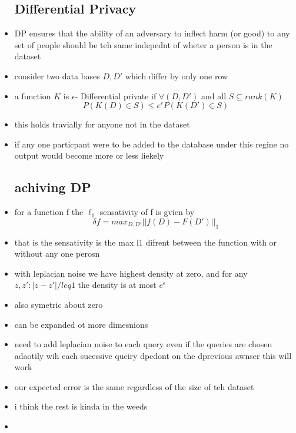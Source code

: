 \documentclass{article}
\begin{document}
\begin{itemize}
\subsection*{Differential Privacy}
\item DP ensures that the ability of an adversary to inflect harm (or good) to any set of people should be teh same indepednt of wheter a person is in the dataset 
\item consider two data bases $D, D'$ which differ by only one row  
\item a function $K$ is $\epsilon$- Differential private if $\forall (D,D')$ and all $S\subseteq rank(K)$ $$P(K(D)\in S)\leq e^{\epsilon}P(K(D')\in S)$$
\item this holds travially for anyone not in the dataset 
\item if any one particpant were to be added to the database under this regine no output would become more or less liekely 
\subsection*{achiving DP}
\item for a function f the $\ell_1$ sensativity of f is gvien by  $$\delta f =max_{D,D'}||f(D)-F(D')||_{1}$$
\item that is the sensativity is the max l1 difrent between the function with or without any one perosn 
\item with leplacian noise we have highest density at zero, and for any $z,z':|z-z'|/leq 1$ the density is at most $e^{\epsilon}$
\item also symetric about zero 
\item can be expanded ot more dimesnions 
\item need to add leplacian noise to each query even if the queries are chosen adaotily wih each sucessive queiry dpedont on the dprevious awnser this will work
\item our expected error is the same regardless of the size of teh dataset 
\item i think the rest is kinda in the weeds
\item 
\end{itemize}
\end{document}
